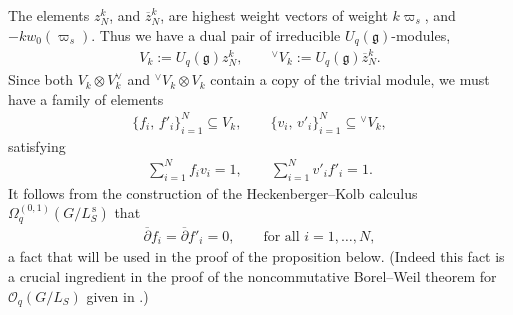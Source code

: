 \documentclass[pdftex]{sigma}
\numberwithin{equation}{section}
\newcommand\adel{\overline{\partial}}
\begin{document}
The elements $z_{N}^k$, and $\overline{z}_{N}^k$, are highest weight vectors of weight $k\varpi_s$, and $-kw_0(\varpi_s)$. Thus we have a dual pair of irreducible $U_q(\mathfrak{g})$-modules,
\begin{gather*}
V_k:= U_q(\mathfrak{g})z^k_N, \qquad {}^{\vee}V_k := U_q(\mathfrak{g})\overline{z}_N^k.
\end{gather*}
Since both $V_k \otimes V_k^{\vee}$ and ${}^{\vee}V_k \otimes V_k$ contain a copy of the trivial module, we must have a family of elements
\begin{gather*} %
\{f_{i}, \, f'_{i}\}_{i=1}^{N} \subseteq V_k, \qquad \{v_i, \, v'_i\}_{i=1}^{N} \subseteq {}^{\vee}V_k,
\end{gather*}
satisfying
\begin{gather}\label{eqn:genDet}
\sum_{i=1}^{N} f_iv_i = 1, \qquad \sum_{i=1}^{N} v'_if'_i = 1.
\end{gather}
It follows from the construction of the Heckenberger--Kolb calculus $\Omega^{(0,1)}_q(G/L_S^{\,\mathrm{s}})$ that
\begin{align} \label{eqn:holof}
\adel f_i = \adel f'_i = 0, \qquad \textrm{for all } i = 1, \dots, N,
\end{align}
a fact that will be used in the proof of the proposition below. (Indeed this fact is a crucial ingredient in the proof of the noncommutative Borel--Weil theorem for $\mathcal{O}_q(G/L_S)$ given in \cite{CDOBBW}.)
\end{document}
